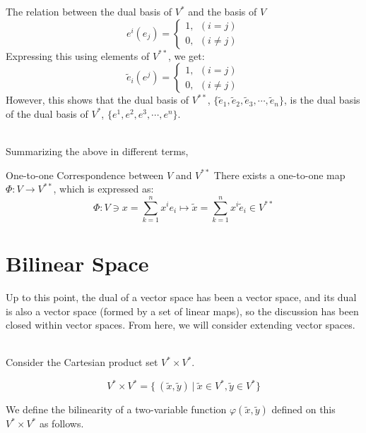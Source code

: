 \documentclass[uplatex,a4j,12pt,dvipdfmx]{jsarticle}
\begin{document}
${}$

The relation between the dual basis of $V^{*}$ and the basis of $V$
\[
	e^{i}(e_{j})
	=
	\left\{
	\begin{array}{l}
		1, \ \ (i=j) \\
		0, \ \ (i \neq j)
	\end{array}
	\right.
\]
Expressing this using elements of $V^{**}$, we get:
\[
	\tilde{e}_{i}(e^{j})
	=
	\left\{
	\begin{array}{l}
		1, \ \ (i=j) \\
		0, \ \ (i \neq j)
	\end{array}
	\right.
\]
However, this
shows that the dual basis of $V^{**}$,
$\{ \tilde{e}_{1}, \tilde{e}_{2}, \tilde{e}_{3}, \cdots , \tilde{e}_{n} \}$,
is the dual basis of the dual basis of $V^{*}$,
$\{ e^{1}, e^{2}, e^{3}, \cdots , e^{n} \}$.

\ \\

Summarizing the above in different terms,

\begin{itembox}[l]{One-to-one Correspondence between $V$ and $V^{**}$}
	There exists a one-to-one map $\Phi : V \to V^{**}$,
	which is expressed as:
	$$
		\Phi: V \ni x = \sum_{k=1}^{n} x^{i} e_{i} \mapsto \tilde{x} = \sum_{k=1}^{n} x^{i} \tilde{e}_{i} \in V^{**}
	$$
\end{itembox}



\section{Bilinear Space}

Up to this point, the dual of a vector space has been a vector space, and its dual is also a vector space (formed by a set of linear maps), so the discussion has been closed within vector spaces.
From here, we will consider extending vector spaces.

\ \\

Consider the Cartesian product set $V^{*} \times V^{*}$.

$$
	V^{*} \times V^{*}
	=
	\{
	\ (\tilde{x}, \tilde{y} ) \ | \ \tilde{x} \in V^{*}, \tilde{y} \in V^{*}
	\}
$$

We define the bilinearity of a two-variable function
$\varphi(\tilde{x},\tilde{y})$ defined on this $V^{*} \times V^{*}$ as follows.
\end{document}
